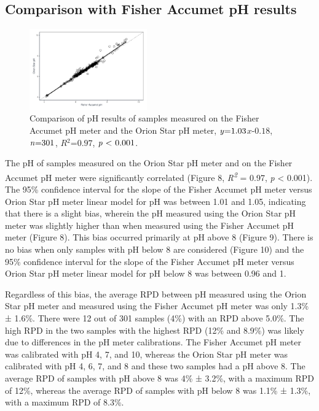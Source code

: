 \documentclass[
]{article}
\begin{document}
\subsection{Comparison with Fisher Accumet pH results}

\begin{figure}
  \vspace{-0.63cm}
  \includegraphics[width=0.45\textwidth]{fisher_v_orion.pdf}
  \caption{Comparison of pH results of samples measured on the Fisher Accumet pH meter and the Orion Star pH meter, $\mbox{\textit{y}=1.03}$$\textit{x}$$\mbox{-0.18}$, $\mbox{\textit{n}=301}$, $\textit{R}$$^2$$\mbox{=0.97}$, $\mbox{\textit{p} < 0.001}$.}
\end{figure}

The pH of samples measured on the Orion Star pH meter and on the Fisher
Accumet pH meter were significantly correlated (Figure 8,
\emph{R\textsuperscript{2}} = 0.97, \emph{p} \textless{} 0.001). The
95\% confidence interval for the slope of the Fisher Accumet pH meter
versus Orion Star pH meter linear model for pH was between 1.01 and
1.05, indicating that there is a slight bias, wherein the pH measured
using the Orion Star pH meter was slightly higher than when measured
using the Fisher Accumet pH meter (Figure 8). This bias occurred
primarily at pH above 8 (Figure 9). There is no bias when only samples
with pH below 8 are considered (Figure 10) and the 95\% confidence
interval for the slope of the Fisher Accumet pH meter versus Orion Star
pH meter linear model for pH below 8 was between 0.96 and 1.

Regardless of this bias, the average RPD between pH measured using the
Orion Star pH meter and measured using the Fisher Accumet pH meter was
only 1.3\% ± 1.6\%. There were 12 out of 301 samples (4\%) with an RPD
above 5.0\%. The high RPD in the two samples with the highest RPD (12\%
and 8.9\%) was likely due to differences in the pH meter calibrations.
The Fisher Accumet pH meter was calibrated with pH 4, 7, and 10, whereas
the Orion Star pH meter was calibrated with pH 4, 6, 7, and 8 and these
two samples had a pH above 8. The average RPD of samples with pH above 8
was 4\% ± 3.2\%, with a maximum RPD of 12\%, whereas the average RPD of
samples with pH below 8 was 1.1\% ± 1.3\%, with a maximum RPD of 8.3\%.
\end{document}
